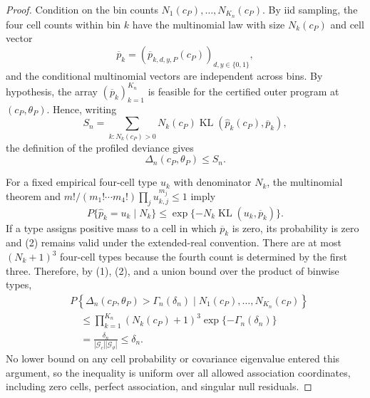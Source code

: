 \documentclass{article}
\begin{document}
\begin{proof}
Condition on the bin counts \(N_1(c_P),\ldots,N_{K_n}(c_P)\).  By iid sampling, the four cell counts within bin \(k\) have the multinomial law with size \(N_k(c_P)\) and cell vector
\[
 \overline p_k=(\overline p_{k,d,y,P}(c_P))_{d,y\in\{0,1\}},
\]
and the conditional multinomial vectors are independent across bins.  By hypothesis, the array \((\overline p_k)_{k=1}^{K_n}\) is feasible for the certified outer program at \((c_P,\theta_P)\).  Hence, writing
\[
 S_n=\sum_{k:N_k(c_P)>0}N_k(c_P)
       \operatorname{KL}(\widehat p_k(c_P),\overline p_k),
\]
the definition of the profiled deviance gives
\[
 \Delta_n(c_P,\theta_P)\le S_n.                                  \tag{1}
\]

For a fixed empirical four-cell type \(u_k\) with denominator \(N_k\), the multinomial theorem and \(m!/(m_1!\cdots m_4!)\prod_j u_{k,j}^{m_j}\le1\) imply
\[
 P\{\widehat p_k=u_k\mid N_k\}
 \le\exp\{-N_k\operatorname{KL}(u_k,\overline p_k)\}.            \tag{2}
\]
If a type assigns positive mass to a cell in which \(\overline p_k\) is zero, its probability is zero and (2) remains valid under the extended-real convention.  There are at most \((N_k+1)^3\) four-cell types because the fourth count is determined by the first three.  Therefore, by (1), (2), and a union bound over the product of binwise types,
\[
\begin{aligned}
 &P\!\left\{\Delta_n(c_P,\theta_P)>\Gamma_n(\delta_n)
       \mid N_1(c_P),\ldots,N_{K_n}(c_P)\right\}\\
 &\quad\le
 \prod_{k=1}^{K_n}(N_k(c_P)+1)^3
       \exp\{-\Gamma_n(\delta_n)\}\\
 &\quad=\frac{\delta_n}{|\mathcal G_c||\mathcal G_\vartheta|}
 \le\delta_n.
\end{aligned}
\]
No lower bound on any cell probability or covariance eigenvalue entered this argument, so the inequality is uniform over all allowed association coordinates, including zero cells, perfect association, and singular null residuals.


\end{proof}
\end{document}
